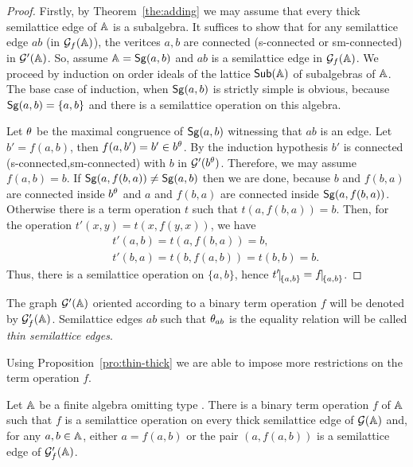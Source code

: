 \documentclass[11pt]{article}
\begin{document}
\begin{proof}
Firstly, by Theorem~\ref{the:adding} we may assume that every thick
semilattice edge of ${\mathbb A}$ is a subalgebra.
It suffices to show that for any semilattice edge $ab$ (in ${\mathcal G}_f({\mathbb A})$),
the veritces $a,b$ are connected (s-connected or sm-connected) in ${\mathcal G}'({\mathbb A})$.
So, assume ${\mathbb A}={\sf Sg}(a,b)$ and $ab$ is a semilattice edge in ${\mathcal G}_f({\mathbb A})$.
We proceed by induction on order ideals of the lattice ${\sf Sub}({\mathbb A})$ of subalgebras 
of ${\mathbb A}$. The base case 
of induction, when ${\sf Sg}(a,b)$ is strictly simple is obvious,
because ${\sf Sg}(a,b)=\{a,b\}$ and there is a semilattice operation on
this algebra.

Let $\theta$ be the maximal congruence of ${\sf Sg}(a,b)$ witnessing that 
$ab$ is an edge. Let $b'=f(a,b)$, then $f(a,b')=b'\in b^\theta$. By the induction
hypothesis $b'$ is connected (s-connected,sm-connected) with $b$ in
${\mathcal G}'(b^\theta)$. Therefore, we may assume $f(a,b)=b$. If 
${\sf Sg}(a,f(b,a))\ne{\sf Sg}(a,b)$ then we are done, because $b$ and
$f(b,a)$ are connected inside $b^\theta$ and $a$ and $f(b,a)$ are
connected inside ${\sf Sg}(a,f(b,a))$. Otherwise there is a term operation 
$t$ such that $t(a,f(b,a))=b$. Then, for the operation
$t'(x,y)=t(x,f(y,x))$, we have
\begin{eqnarray*}
&& t'(a,b)=t(a,f(b,a))=b,\\
&& t'(b,a)=t(b,f(a,b))=t(b,b)=b.
\end{eqnarray*}
Thus, there is a semilattice operation on $\{a,b\}$, hence
$t'\red{\{a,b\}}=f\red{\{a,b\}}$. 
\end{proof}

The graph ${\mathcal G}'({\mathbb A})$ oriented according to a binary term operation $f$ will be
denoted by ${\mathcal G}'_f({\mathbb A})$. Semilattice edges $ab$ such that $\theta_{ab}$ is
the equality relation will be called \emph{thin semilattice edges}.

Using Proposition~\ref{pro:thin-thick} we are able to impose more
restrictions on the term operation $f$.
\begin{prop}\label{pro:good-operation}
Let ${\mathbb A}$ be a finite algebra omitting type \one. There is a binary
term operation $f$ of ${\mathbb A}$ such that $f$ is a semilattice operation on
every thick semilattice edge of ${\mathcal G}({\mathbb A})$ and, for any $a,b\in{\mathbb A}$, either
$a=f(a,b)$ or the pair $(a,f(a,b))$ is a semilattice edge of ${\mathcal G}'_f({\mathbb A})$.
\end{prop}
\end{document}
